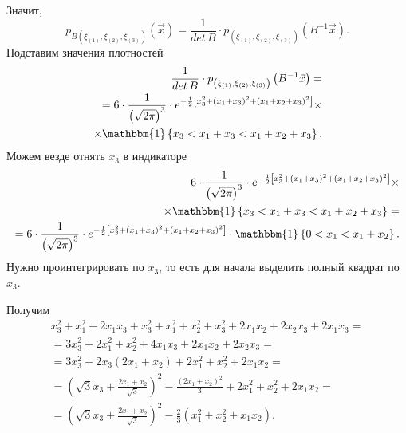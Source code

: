 \begin{enumerate}[label=\alph*)]
  Значит,
  $$p_{B \left( \xi_{ \left( 1 \right) }, \xi_{ \left( 2 \right) }, \xi_{ \left( 3 \right) } \right) }
      \left( \vec{x} \right) =
    \frac{1}{det \, B} \cdot
    p_{ \left( \xi_{ \left( 1 \right) }, \xi_{ \left( 2 \right) }, \xi_{ \left( 3 \right) } \right) }
      \left( B^{-1} \vec{x} \right).$$
  Подставим значения плотностей
  \begin{equation*}
    \begin{split}
      \frac{1}{det \, B} \cdot
      p_{ \left( \xi_{ \left( 1 \right) }, \xi_{ \left( 2 \right) }, \xi_{ \left( 3 \right) } \right) }
        \left( B^{-1} \vec{x} \right) = \\
      = 6 \cdot \frac{1}{ \left( \sqrt{2 \pi } \right)^3} \cdot
      e^{- \frac{1}{2} \left[ x_3^2 + \left( x_1 + x_3 \right)^2 + \left( x_1 + x_2 + x_3 \right)^2 \right] } \times \\
      \times \mathbbm{1} \left\{ x_3 < x_1 + x_3 < x_1 + x_2 + x_3 \right\}.
    \end{split}
  \end{equation*}
  Можем везде отнять $x_3$ в индикаторе
  \begin{equation*}
    \begin{split}
      6 \cdot \frac{1}{ \left( \sqrt{2 \pi } \right)^3} \cdot
      e^{- \frac{1}{2} \left[ x_3^2 + \left( x_1 + x_3 \right)^2 + \left( x_1 + x_2 + x_3 \right)^2 \right] } \times \\
      \times \mathbbm{1} \left\{ x_3 < x_1 + x_3 < x_1 + x_2 + x_3 \right\} = \\
      = 6 \cdot \frac{1}{ \left( \sqrt{2 \pi } \right)^3} \cdot
      e^{- \frac{1}{2} \left[ x_3^2 + \left( x_1 + x_3 \right)^2 + \left( x_1 + x_2 + x_3 \right)^2 \right] } \cdot
      \mathbbm{1} \left\{ 0 < x_1 < x_1 + x_2 \right\}.
    \end{split}
  \end{equation*}
  Нужно проинтегрировать по $x_3$, то есть для начала выделить полный квадрат по $x_3$.

  Получим
  \begin{equation*}
    \begin{split}
      x_3^2 + x_1^2 + 2x_1 x_3 + x_3^2 + x_1^2 + x_2^2 + x_3^2 + 2x_1 x_2 + 2x_2 x_3 + 2x_1 x_3 = \\
      = 3x_3^2 + 2x_1^2 + x_2^2 + 4x_1 x_3 + 2x_1 x_2 + 2x_2 x_3 = \\
      = 3x_3^2 + 2x_3 \left( 2x_1 + x_2 \right) + 2x_1^2 + x_2^2 +2x_1x_2 = \\
      = \left( \sqrt{3} x_3 + \frac{2x_1 + x_2}{ \sqrt{3}} \right)^2 -
      \frac{ \left( 2x_1 + x_2 \right)^2}{3} + 2x_1^2 + x_2^2 + 2x_1 x_2 = \\
      = \left( \sqrt{3} x_3 + \frac{2x_1 + x_2}{ \sqrt{3}} \right)^2 -
      \frac{2}{3} \left( x_1^2 + x_2^2 + x_1 x_2 \right) .
    \end{split}
  \end{equation*}


\end{enumerate}
